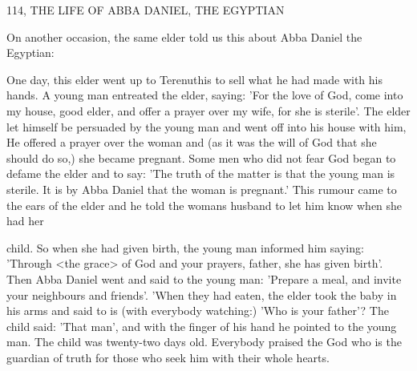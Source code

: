 114, THE LIFE OF ABBA DANIEL, THE EGYPTIAN

On another occasion, the same elder told us this about Abba Daniel
the Egyptian:

One day, this elder went up to Terenuthis to sell what he had made
with his hands. A young man entreated the elder, saying: 'For the
love of God, come into my house, good elder, and offer a prayer
over my wife, for she is sterile'. The elder let himself be persuaded
by the young man and went off into his house with him, He offered
a prayer over the woman and (as it was the will of God that she
should do so,) she became pregnant. Some men who did not fear
God began to defame the elder and to say: 'The truth of the matter
is that the young man is sterile. It is by Abba Daniel that the
woman is pregnant.' This rumour came to the ears of the elder and
he told the woman\textquotesingle s husband to let him know when she had her

child. So when she had given birth, the young man informed him
saying: 'Through <the grace> of God and your prayers, father, she
has given birth'. Then Abba Daniel went and said to the young
man: 'Prepare a meal, and invite your neighbours and friends'.
'When they had eaten, the elder took the baby in his arms and said
to is (with everybody watching:) 'Who is your father'? The child
said: 'That man', and with the finger of his hand he pointed to the
young man. The child was twenty-two days old. Everybody praised
the God who is the guardian of truth for those who seek him with
their whole hearts.


